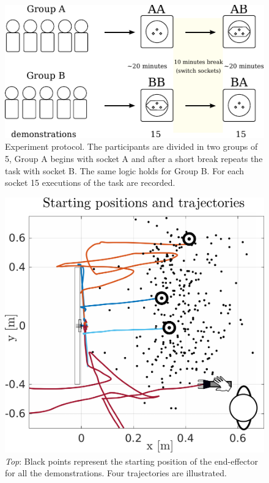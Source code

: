 \documentclass[final,5p,times,twocolumn]{elsarticle}
\begin{document}
\begin{figure}
\centering
 \includegraphics[width=0.9\linewidth]{./Figures/Fig/experiment_design_v2.pdf}
 \caption{Experiment protocol. The participants are divided in two groups of 5, Group A begins with socket A 
 and after a short break repeats the task with socket B. The same logic holds for Group B.
 For each socket 15 executions of the task are recorded.}
 \label{fig:experiment_design}
\end{figure}

\begin{figure}
 \centering
   \includegraphics[width=0.9\linewidth]{./Figure/example_trajectories.pdf}
   \caption{\textit{Top}: Black points represent the starting position of the end-effector
   for all the demonstrations. Four trajectories are illustrated.}
  \label{fig:experiment_setup_data}
\end{figure}
\end{document}
